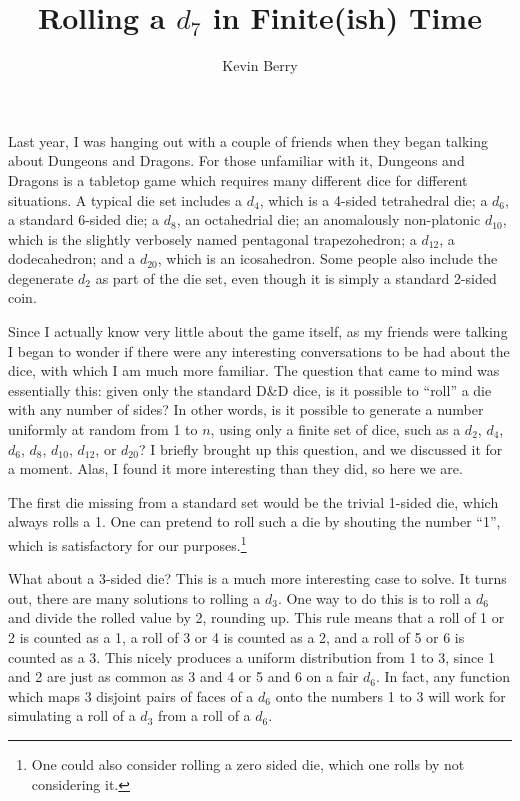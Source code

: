 \documentclass{article}
\title{Rolling a $d_7$ in Finite(ish) Time}
\author{Kevin Berry}
\begin{document}
\maketitle

\par Last year, I was hanging out with a couple of friends when they began talking about Dungeons and Dragons.
For those unfamiliar with it, Dungeons and Dragons is a tabletop game which requires many different dice for different situations. 
A typical die set includes a $d_4$, which is a 4-sided tetrahedral die; a $d_6$, a standard 6-sided die; a $d_8$, an octahedrial die; an anomalously non-platonic $d_{10}$, which is the slightly verbosely named pentagonal trapezohedron; a $d_{12}$, a dodecahedron; and a $d_{20}$, which is an icosahedron.
Some people also include the degenerate $d_2$ as part of the die set, even though it is simply a standard 2-sided coin.

\par Since I actually know very little about the game itself, as my friends were talking I began to wonder if there were any interesting conversations to be had about the dice, with which I am much more familiar.
The question that came to mind was essentially this: given only the standard D\&D dice, is it possible to ``roll'' a die with any number of sides? 
In other words, is it possible to generate a number uniformly at random from 1 to $n$, using only a finite set of dice, such as a $d_2$, $d_4$, $d_6$, $d_8$, $d_{10}$, $d_{12}$, or $d_{20}$?
I briefly brought up this question, and we discussed it for a moment.
Alas, I found it more interesting than they did, so here we are.

\par The first die missing from a standard set would be the trivial 1-sided die, which always rolls a 1.
One can pretend to roll such a die by shouting the number ``1'', which is satisfactory for our purposes.\footnote{One could also consider rolling a zero sided die, which one rolls by not considering it.}

\par What about a 3-sided die?
This is a much more interesting case to solve.
It turns out, there are many solutions to rolling a $d_3$.
One way to do this is to roll a $d_6$ and divide the rolled value by 2, rounding up.
This rule means that a roll of 1 or 2 is counted as a 1, a roll of 3 or 4 is counted as a 2, and a roll of 5 or 6 is counted as a 3.
This nicely produces a uniform distribution from 1 to 3, since 1 and 2 are just as common as 3 and 4 or 5 and 6 on a fair $d_6$.
In fact, any function which maps 3 disjoint pairs of faces of a $d_6$ onto the numbers 1 to 3 will work for simulating a roll of a $d_3$ from a roll of a $d_6$.
\end{document}
